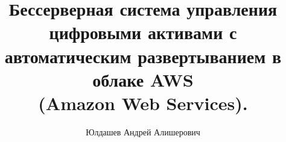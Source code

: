 \title{Бессерверная система управления цифровыми активами с автоматическим развертыванием в облаке AWS \\(Amazon Web Services).}
\author{Юлдашев Андрей Алишерович}
\maketitle